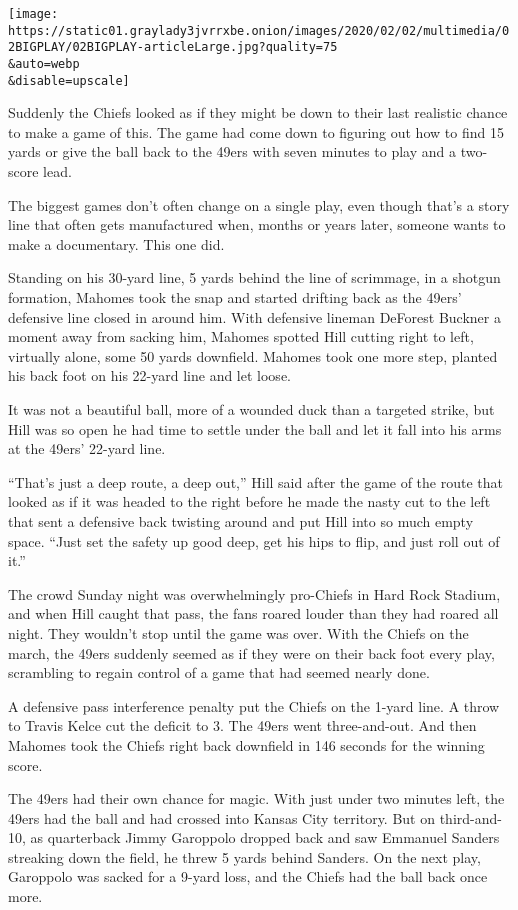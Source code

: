 \texttt{[image: https://static01.graylady3jvrrxbe.onion/images/2020/02/02/multimedia/02BIGPLAY/02BIGPLAY-articleLarge.jpg?quality=75\\\&auto=webp\\\&disable=upscale]}

Suddenly the Chiefs looked as if they might be down to their last
realistic chance to make a game of this. The game had come down to
figuring out how to find 15 yards or give the ball back to the 49ers
with seven minutes to play and a two-score lead.

The biggest games don't often change on a single play, even though
that's a story line that often gets manufactured when, months or years
later, someone wants to make a documentary. This one did.

Standing on his 30-yard line, 5 yards behind the line of scrimmage, in a
shotgun formation, Mahomes took the snap and started drifting back as
the 49ers' defensive line closed in around him. With defensive lineman
DeForest Buckner a moment away from sacking him, Mahomes spotted Hill
cutting right to left, virtually alone, some 50 yards downfield. Mahomes
took one more step, planted his back foot on his 22-yard line and let
loose.

It was not a beautiful ball, more of a wounded duck than a targeted
strike, but Hill was so open he had time to settle under the ball and
let it fall into his arms at the 49ers' 22-yard line.

``That's just a deep route, a deep out,'' Hill said after the game of
the route that looked as if it was headed to the right before he made
the nasty cut to the left that sent a defensive back twisting around and
put Hill into so much empty space. ``Just set the safety up good deep,
get his hips to flip, and just roll out of it.''

The crowd Sunday night was overwhelmingly pro-Chiefs in Hard Rock
Stadium, and when Hill caught that pass, the fans roared louder than
they had roared all night. They wouldn't stop until the game was over.
With the Chiefs on the march, the 49ers suddenly seemed as if they were
on their back foot every play, scrambling to regain control of a game
that had seemed nearly done.

A defensive pass interference penalty put the Chiefs on the 1-yard line.
A throw to Travis Kelce cut the deficit to 3. The 49ers went
three-and-out. And then Mahomes took the Chiefs right back downfield in
146 seconds for the winning score.

The 49ers had their own chance for magic. With just under two minutes
left, the 49ers had the ball and had crossed into Kansas City territory.
But on third-and-10, as quarterback Jimmy Garoppolo dropped back and saw
Emmanuel Sanders streaking down the field, he threw 5 yards behind
Sanders. On the next play, Garoppolo was sacked for a 9-yard loss, and
the Chiefs had the ball back once more.

